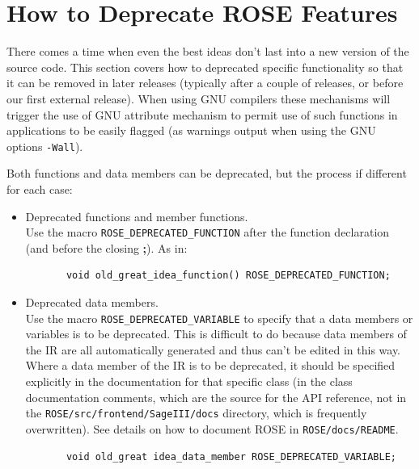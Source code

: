 
\section{How to Deprecate ROSE Features}%

    There comes a time when even the best ideas don't last
into a new version of the source code.  This section covers how to
deprecated specific functionality so that it can be removed in
later releases (typically after a couple of releases, or before
our first external release).  When using GNU compilers these mechanisms
will trigger the use of GNU attribute mechanism to permit use of such
functions in applications to be easily flagged (as warnings
output when using the GNU options {\tt -Wall}).

Both functions and data members can be deprecated, but the process if different 
for each case:
\begin{itemize}
    \item Deprecated functions and member functions. \\
          Use the macro {\tt ROSE\_DEPRECATED\_FUNCTION} after the function declaration (and before
          the closing {\bf ;}). As in:
{\indent
{\mySmallFontSize
\begin{verbatim}
       void old_great_idea_function() ROSE_DEPRECATED_FUNCTION;
\end{verbatim}
}}

    \item Deprecated data members. \\
        Use the macro {\tt ROSE\_DEPRECATED\_VARIABLE} to specify that a data members 
    or variables is to be deprecated.  This is difficult to do because data members of 
    the IR are all automatically generated and thus can't be edited in this way.  Where 
    a data member of the IR is to be deprecated, it should be specified explicitly in
    the documentation for that specific class (in the class documentation comments,
    which are the source for the API reference, not in the
    {\tt ROSE/src/frontend/SageIII/docs} directory, which is frequently overwritten).  See
    details on how to document ROSE in {\tt ROSE/docs/README}.
{\indent
{\mySmallFontSize
\begin{verbatim}
       void old_great idea_data_member ROSE_DEPRECATED_VARIABLE;
\end{verbatim} 
}}
\end{itemize}


